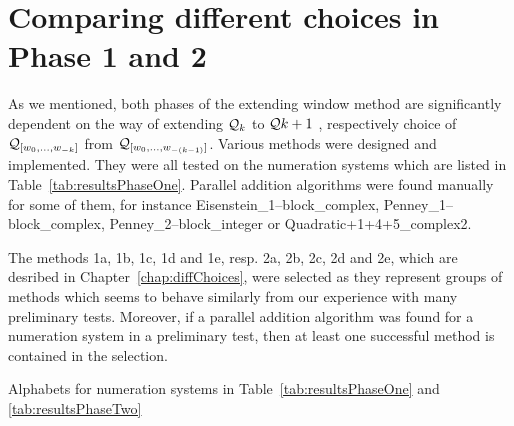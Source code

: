 

\section{Comparing different choices in Phase 1 and 2}
\label{sec:compareMethods}

As we mentioned, both phases of the extending window method are significantly dependent on the way of extending $\mathcal{Q}_k$ to $\mathcal{Q}{k+1}$ , respectively choice of $\mathcal{Q}_{[w_{0}, \dots, w_{-k}]}$ from $\mathcal{Q}_{[w_{0}, \dots, w_{-(k-1)}]}$. Various methods were designed and implemented. They were all tested on the numeration systems which are listed in Table~\ref{tab:resultsPhaseOne}. Parallel addition algorithms were found manually~\cite{milena} for some of them, for instance Eisenstein\_1--block\_complex, Penney\_1--block\_complex, Penney\_2--block\_integer or Quadratic+1+4+5\_complex2. 

The methods 1a, 1b, 1c, 1d and 1e, resp. 2a, 2b, 2c, 2d and 2e, which are desribed in Chapter~\ref{chap:diffChoices}, were selected as they represent groups of methods which seems to behave similarly from our experience with many preliminary tests. Moreover, if a parallel addition algorithm was found for a numeration system in a preliminary test, then at least one successful method is contained in the selection.



\begin{table}[htb]
	\begin{center}
	
	\end{center}
\caption{Alphabets for numeration systems in Table~\ref{tab:resultsPhaseOne} and \ref{tab:resultsPhaseTwo}}
\label{tab:alphabets}
\end{table}





